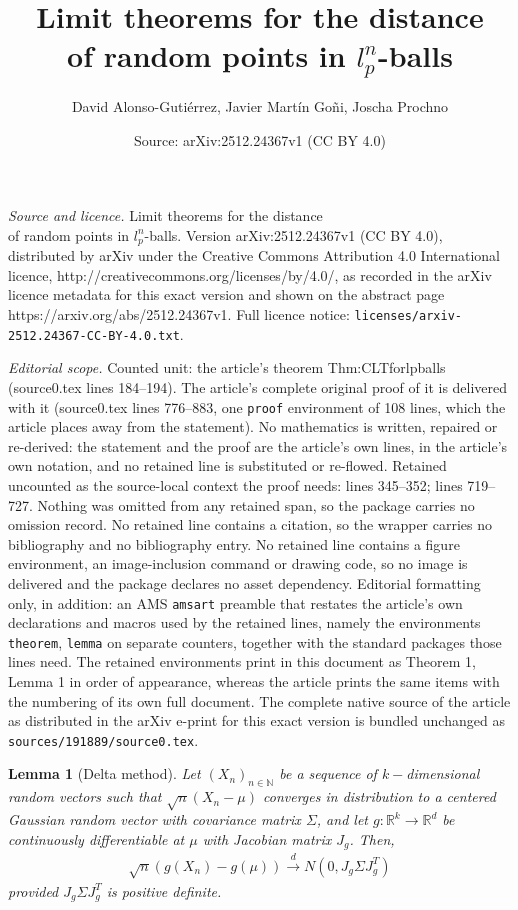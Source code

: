 \documentclass[10pt,a4paper]{amsart}
\title{Limit theorems for the distance \\of random points in $l_p^n$-balls}
\author{David Alonso-Guti\'errez, Javier Mart\'in Go\~ni, Joscha Prochno}
\date{Source: arXiv:2512.24367v1 (CC BY 4.0)}
\newtheorem{lemma}{Lemma}
\def\N{\mathbb{N}}
\def\R{\mathbb{R}}
\begin{document}
\maketitle

\noindent\emph{Source and licence.} Limit theorems for the distance \\of random points in $l_p^n$-balls. Version arXiv:2512.24367v1 (CC BY 4.0), distributed by arXiv under the Creative Commons Attribution 4.0 International licence, http://creativecommons.org/licenses/by/4.0/, as recorded in the arXiv licence metadata for this exact version and shown on the abstract page https://arxiv.org/abs/2512.24367v1. Full licence notice: \texttt{licenses/arxiv-2512.24367-CC-BY-4.0.txt}.\par\smallskip

\noindent\textit{Editorial scope.} Counted unit: the article's theorem Thm:CLTforlpballs (source0.tex lines 184--194). The article's complete original proof of it is delivered with it (source0.tex lines 776--883, one \texttt{proof} environment of 108 lines, which the article places away from the statement). No mathematics is written, repaired or re-derived: the statement and the proof are the article's own lines, in the article's own notation, and no retained line is substituted or re-flowed.  Retained uncounted as the source-local context the proof needs: lines 345--352; lines 719--727.  Nothing was omitted from any retained span, so the package carries no omission record.  No retained line contains a citation, so the wrapper carries no bibliography and no bibliography entry.  No retained line contains a figure environment, an image-inclusion command or drawing code, so no image is delivered and the package declares no asset dependency.  Editorial formatting only, in addition: an AMS \texttt{amsart} preamble that restates the article's own declarations and macros used by the retained lines, namely the environments \texttt{theorem}, \texttt{lemma} on separate counters, together with the standard packages those lines need.  The retained environments print in this document as Theorem 1, Lemma 1 in order of appearance, whereas the article prints the same items with the numbering of its own full document.  The complete native source of the article as distributed in the arXiv e-print for this exact version is bundled unchanged as \texttt{sources/191889/source0.tex}.
\begin{lemma}[Delta method]
\label{DeltaMethod}
Let $(X_n)_{n\in\N}$ be a sequence of $k-$dimensional random vectors such that $\sqrt{n}(X_n - \mu)$ converges in distribution to a centered Gaussian random vector with covariance matrix $\Sigma$, and let $g:\mathbb{R}^k \to \R^d$ be continuously differentiable at $\mu$ with Jacobian matrix $J_g$. Then,
\begin{align*}
\sqrt{n} (g(X_n) - g(\mu) ) \overset{d}{\longrightarrow} N\left( 0 , J_g \Sigma J_g^T \right)
\end{align*}
provided $J_g \Sigma J_g^T$ is positive definite.
\end{lemma}
\end{document}
